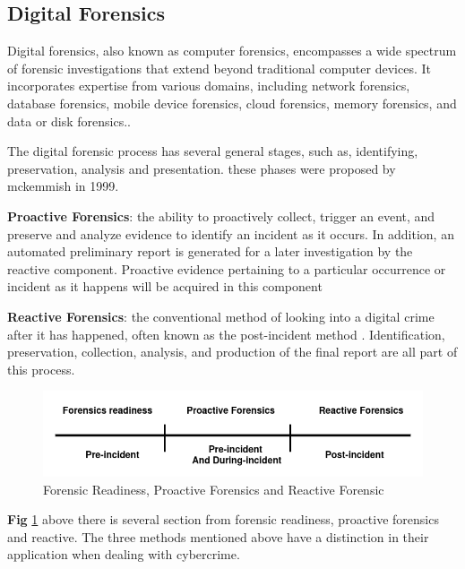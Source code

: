 \subsection{Digital Forensics}  Digital forensics, also known as computer forensics, encompasses a wide spectrum of forensic investigations that extend beyond traditional computer devices. It incorporates expertise from various domains, including network forensics, database forensics, mobile device forensics, cloud forensics, memory forensics, and data or disk forensics.\cite{paul2019analysisdf}.

The digital forensic process has several general stages, such as, identifying, preservation, analysis and presentation. these phases were proposed by mckemmish in 1999.

\textbf{Proactive Forensics}: the ability to proactively collect, trigger an
event, and preserve and analyze evidence to identify an incident as it occurs. In addition, an automated preliminary report is generated for a later
investigation by the reactive component. Proactive evidence pertaining to
a particular occurrence or incident as it happens will be acquired in this
component \cite{proactiveandreactivedigitalforensics}

\textbf{Reactive Forensics}:  the conventional method of looking into
a digital crime after it has happened, often known as the post-incident
method \cite{proactiveandreactivedigitalforensics}. Identification, preservation, collection, analysis, and production of the final report are all part of this process.

\begin{figure}[H] 
    \centering
    \includegraphics[width=14cm]{figure/flow-fr-pro-react.jpg}
    \caption{Forensic Readiness, Proactive Forensics and Reactive Forensic }
    \label{fig:fr-pro-reac}
\end{figure}

\textbf{Fig} \ref{fig:fr-pro-reac} above there is several section from forensic readiness, proactive forensics and reactive. The three methods mentioned above have a distinction in their application when dealing with cybercrime.

